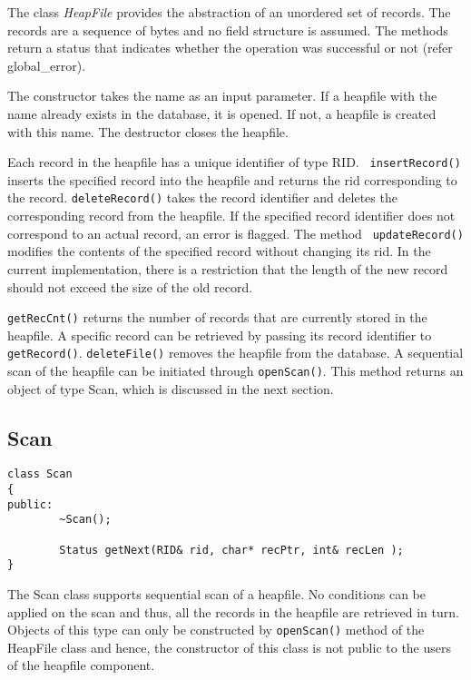 The class {\em HeapFile} provides the abstraction  of an unordered set
of records. The records are a sequence of bytes and no field structure
is assumed.  The  methods return  a status  that indicates whether the
operation was successful or not (refer global\_error).

The constructor takes the  name as an input  parameter. If  a heapfile
with the name already exists in the database,  it is opened. If not, a
heapfile   is created with   this   name. The  destructor closes   the
heapfile.

Each record in the heapfile has a unique  identifier of type RID. {\tt
insertRecord()} inserts the specified  record  into the heapfile   and
returns  the rid corresponding   to  the record. {\tt  deleteRecord()}
takes the record identifier  and deletes the corresponding record from
the  heapfile. If the  specified record identifier does not correspond
to  an  actual  record,   an  error  is   flagged.  The  method   {\tt
updateRecord()} modifies the contents of  the specified record without
changing   its   rid. In the    current   implementation,  there is  a
restriction that the  length of the  new record should not exceed  the
size of the old record.

{\tt  getRecCnt()}  returns the  number of  records that are currently
stored in the heapfile. A specific  record can be retrieved by passing
its record   identifier to   {\tt  getRecord()}.   {\tt  deleteFile()}
removes  the heapfile  from the  database.   A sequential scan of  the
heapfile  can  be initiated   through  {\tt openScan()}.   This method
returns an object   of type  Scan, which is   discussed  in  the  next
section.

\subsection{Scan}

\begin{verbatim}
class Scan
{
public:
        ~Scan();

        Status getNext(RID& rid, char* recPtr, int& recLen );
}
\end{verbatim}

The Scan class supports  sequential scan of  a heapfile. No conditions
can be applied  on the scan and thus,  all the records in the heapfile
are retrieved in turn. Objects of this type can only be constructed by
{\tt openScan()}   method  of  the  HeapFile    class and hence,   the
constructor of this class is  not public to  the users of the heapfile
component.

